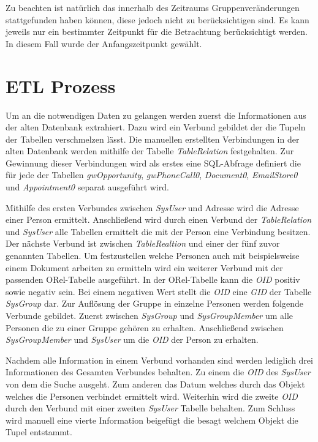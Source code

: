 Zu beachten ist natürlich das innerhalb des Zeitraums Gruppenveränderungen stattgefunden haben können, diese jedoch nicht zu berücksichtigen sind. Es kann jeweils nur ein bestimmter Zeitpunkt für die Betrachtung berücksichtigt werden. In diesem Fall wurde der Anfangszeitpunkt gewählt.

\section{ETL Prozess}

Um an die notwendigen Daten zu gelangen werden zuerst die Informationen aus der alten Datenbank extrahiert. Dazu wird ein Verbund gebildet der die Tupeln der Tabellen verschmelzen lässt. Die manuellen erstellten Verbindungen in der alten Datenbank werden mithilfe der Tabelle \textit{TableRelation} festgehalten. Zur Gewinnung dieser Verbindungen wird als erstes eine SQL-Abfrage definiert die für jede der Tabellen \textit{gwOpportunity}, \textit{gwPhoneCall0}, \textit{Document0}, \textit{EmailStore0} und \textit{Appointment0} separat ausgeführt wird. 

Mithilfe des ersten Verbundes zwischen \textit{SysUser} und Adresse wird die Adresse einer Person ermittelt. Anschließend wird durch einen Verbund der \textit{TableRelation} und \textit{SysUser} alle Tabellen ermittelt die mit der Person eine Verbindung besitzen. Der nächste Verbund ist zwischen \textit{TableRealtion} und einer der fünf zuvor genannten Tabellen. Um festzustellen welche Personen auch mit beispielsweise einem Dokument arbeiten zu ermitteln wird ein weiterer Verbund mit der passenden ORel-Tabelle ausgeführt. In der ORel-Tabelle kann die \textit{OID} positiv sowie negativ sein. Bei einem negativen Wert stellt die \textit{OID} eine \textit{GID} der Tabelle \textit{SysGroup} dar. Zur Auflösung der Gruppe in einzelne Personen werden folgende Verbunde gebildet. Zuerst zwischen \textit{SysGroup} und \textit{SysGroupMember} um alle Personen die zu einer Gruppe gehören zu erhalten. Anschließend zwischen \textit{SysGroupMember} und \textit{SysUser} um die \textit{OID} der Person zu erhalten. 

Nachdem alle Information in einem Verbund vorhanden sind werden lediglich drei Informationen des Gesamten Verbundes behalten. Zu einem die \textit{OID} des \textit{SysUser} von dem die Suche ausgeht. Zum anderen das Datum welches durch das Objekt welches die Personen verbindet ermittelt wird. Weiterhin wird die zweite \textit{OID} durch den Verbund mit einer zweiten \textit{SysUser} Tabelle behalten. Zum Schluss wird manuell eine vierte Information beigefügt die besagt welchem Objekt die Tupel entstammt. 

